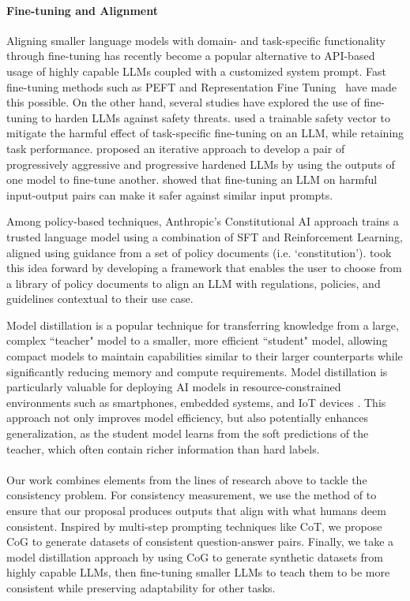 \paragraph{Fine-tuning and Alignment}
Aligning smaller language models with domain- and task-specific functionality through fine-tuning has recently become a popular alternative to API-based usage of highly capable LLMs coupled with a customized system prompt. Fast fine-tuning methods such as PEFT and Representation Fine Tuning~\cite[ReFT]{wu2024reft} have made this possible. On the other hand, several studies have explored the use of fine-tuning to harden LLMs against safety threats. \citet{bhardwaj2024language} used a trainable safety vector to mitigate the harmful effect of task-specific fine-tuning on an LLM, while retaining task performance. \citet{ge2023mart} proposed an iterative approach to develop a pair of progressively aggressive and progressive hardened LLMs by using the outputs of one model to fine-tune another. \citet{samvelyan2024rainbow} showed that fine-tuning an LLM on harmful input-output pairs can make it safer against similar input prompts.

Among policy-based techniques, Anthropic's Constitutional AI approach \citep{bai2022constitutional} trains a trusted language model using a combination of SFT and Reinforcement Learning, aligned using guidance from a set of policy documents (i.e. `constitution'). \citet{achintalwar2024alignment} took this idea forward by developing a framework that enables the user to choose from a library of policy documents to align an LLM with regulations, policies, and guidelines contextual to their use case.

Model distillation \citep{hinton2015distilling,gou2021knowledge} is a popular technique for transferring knowledge from a large, complex ``teacher" model to a smaller, more efficient ``student" model, allowing compact models to maintain capabilities similar to their larger counterparts while significantly reducing memory and compute requirements. Model distillation is particularly valuable for deploying AI models in resource-constrained environments such as smartphones, embedded systems, and IoT devices \citep{park2019relational}. This approach not only improves model efficiency, but also potentially enhances generalization, as the student model learns from the soft predictions of the teacher, which often contain richer information than hard labels.

\paragraph{}
Our work combines elements from the lines of research above to tackle the consistency problem. For consistency measurement, we use the method of \citet{raj2023measuring} to ensure that our proposal produces outputs that align with what humans deem consistent. Inspired by multi-step prompting techniques like CoT, we propose CoG to generate datasets of consistent question-answer pairs. Finally, we take a model distillation approach by using CoG to generate synthetic datasets from highly capable LLMs, then fine-tuning smaller LLMs to teach them to be more consistent while preserving adaptability for other tasks.


